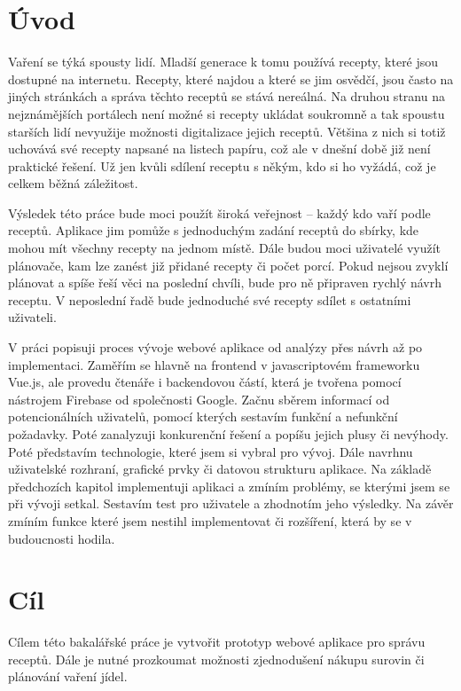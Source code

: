 
\chapter{Úvod}

Vaření se týká spousty lidí. Mladší generace k tomu používá recepty, které jsou dostupné na internetu. Recepty, které najdou
a které se jim osvědčí, jsou často na jiných stránkách a správa těchto receptů se stává nereálná. Na druhou stranu na nejznámějších
portálech není možné si recepty ukládat soukromně a tak spoustu starších lidí nevyužije možnosti digitalizace jejich receptů.
Většina z nich si totiž uchovává své recepty napsané na listech papíru, což ale v dnešní době již není praktické řešení. Už jen kvůli
sdílení receptu s někým, kdo si ho vyžádá, což je celkem běžná záležitost.

Výsledek této práce bude moci použít široká veřejnost -- každý kdo vaří podle receptů. Aplikace jim pomůže s jednoduchým
zadání receptů do sbírky, kde mohou mít všechny recepty na jednom místě. Dále budou moci uživatelé využít plánovače, kam
lze zanést již přidané recepty či počet porcí. Pokud nejsou zvyklí plánovat a spíše řeší věci na poslední chvíli, bude
pro ně připraven rychlý návrh receptu. V neposlední řadě bude jednoduché své recepty sdílet s ostatními uživateli.

V práci popisuji proces vývoje webové aplikace od analýzy přes návrh až po implementaci. Zaměřím se hlavně na frontend v
javascriptovém frameworku Vue.js, ale provedu čtenáře i backendovou částí, která je tvořena pomocí nástrojem Firebase od
společnosti Google. Začnu sběrem informací od potencionálních uživatelů, pomocí kterých sestavím funkční a nefunkční požadavky.
Poté zanalyzuji konkurenční řešení a popíšu jejich plusy či nevýhody. Poté představím technologie, které jsem si vybral pro
vývoj. Dále navrhnu uživatelské rozhraní, grafické prvky či datovou strukturu aplikace. Na základě předchozích kapitol implementuji
aplikaci a zmíním problémy, se kterými jsem se při vývoji setkal. Sestavím test pro uživatele a zhodnotím jeho výsledky.
Na závěr zmíním funkce které jsem nestihl implementovat či rozšíření, která by se v budoucnosti hodila.

\chapter{Cíl}
Cílem této bakalářské práce je vytvořit prototyp webové aplikace pro správu receptů. Dále je nutné prozkoumat možnosti
zjednodušení nákupu surovin či plánování vaření jídel.

